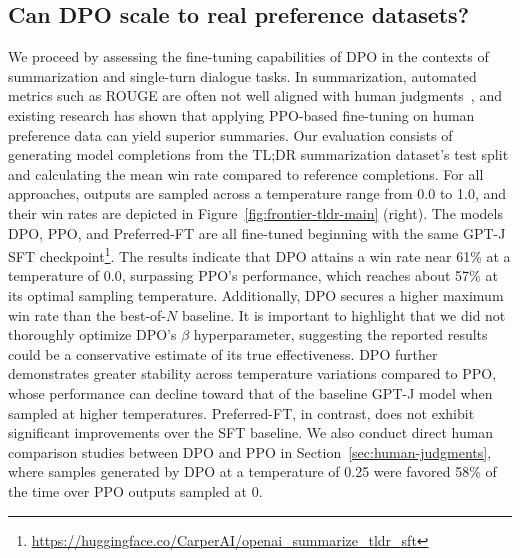 \subsection{Can DPO scale to real preference datasets?}
\label{sec:dpo-real-datasets}
We proceed by assessing the fine-tuning capabilities of DPO in the contexts of summarization and single-turn dialogue tasks. In summarization, automated metrics such as ROUGE are often not well aligned with human judgments~\citep{stiennon2022learning}, and existing research has shown that applying PPO-based fine-tuning on human preference data can yield superior summaries. Our evaluation consists of generating model completions from the TL;DR summarization dataset's test split and calculating the mean win rate compared to reference completions. For all approaches, outputs are sampled across a temperature range from 0.0 to 1.0, and their win rates are depicted in Figure~\ref{fig:frontier-tldr-main} (right). The models DPO, PPO, and Preferred-FT are all fine-tuned beginning with the same GPT-J SFT checkpoint\footnote{\url{https://huggingface.co/CarperAI/openai_summarize_tldr_sft}}. The results indicate that DPO attains a win rate near 61\% at a temperature of 0.0, surpassing PPO's performance, which reaches about 57\% at its optimal sampling temperature. Additionally, DPO secures a higher maximum win rate than the best-of-$N$ baseline. It is important to highlight that we did not thoroughly optimize DPO's $\beta$ hyperparameter, suggesting the reported results could be a conservative estimate of its true effectiveness. DPO further demonstrates greater stability across temperature variations compared to PPO, whose performance can decline toward that of the baseline GPT-J model when sampled at higher temperatures. Preferred-FT, in contrast, does not exhibit significant improvements over the SFT baseline. We also conduct direct human comparison studies between DPO and PPO in Section~\ref{sec:human-judgments}, where samples generated by DPO at a temperature of 0.25 were favored 58\% of the time over PPO outputs sampled at 0.

